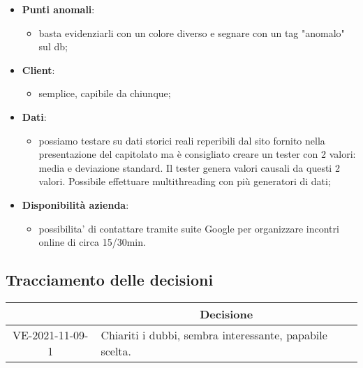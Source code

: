 \begin{itemize}
\begin{itemize}
		\end{itemize}
	\item \textbf{Punti anomali}:
		\begin{itemize}
			\item basta evidenziarli con un colore diverso e segnare con un tag "anomalo" sul db;
		\end{itemize}
	\item \textbf{Client}:
		\begin{itemize}
			\item semplice, capibile da chiunque;
		\end{itemize}
	\item \textbf{Dati}:
		\begin{itemize}
			\item possiamo testare su dati storici reali reperibili dal sito fornito nella presentazione del capitolato ma è consigliato creare un tester con 2 valori: media e deviazione standard. Il tester genera valori causali da questi 2 valori. Possibile effettuare multithreading con più generatori di dati;
		\end{itemize}
	\item \textbf{Disponibilità azienda}:
		\begin{itemize}
			\item possibilita' di contattare tramite suite Google per organizzare incontri online di circa 15/30min.
		\end{itemize}
\end{itemize}

\pagebreak

\subsection{Tracciamento delle decisioni}

\begin{table}[H]
	\centering
	\renewcommand{\arraystretch}{1.8}
	\begin{tabular}{c | p{10cm}}
		\rowcolor[HTML]{125E28}
		\multicolumn{1}{c}{\color[HTML]{FFFFFF} \textbf{ID}} &
		\multicolumn{1}{c}{\color[HTML]{FFFFFF} \textbf{Decisione}} \\
		\hline
		VE-2021-11-09-1 & Chiariti i dubbi, sembra interessante, papabile scelta. \\
	\end{tabular}
\end{table}